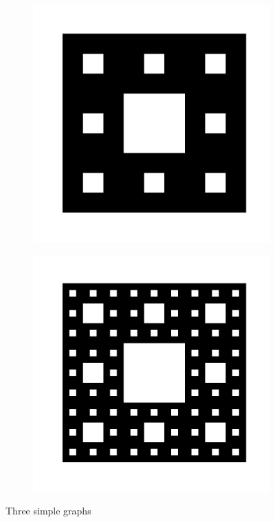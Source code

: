 \begin{figure}[h!]
\begin{subfigure}[b!]{0.27 \textwidth}
         \label{}
     \end{subfigure}\hspace*{-0.9em}
     \begin{subfigure}[b!]{0.27 \textwidth}
         \caption{}
         \includegraphics[width=\textwidth]{Imagenes/Fractal/sierpinski_carpet_3.pdf}
         \label{}
     \end{subfigure}\hspace*{-0.9em}
     \begin{subfigure}[b!]{0.27 \textwidth}
         \caption{}
         \includegraphics[width=\textwidth]{Imagenes/Fractal/sierpinski_carpet_4.pdf}
         \label{}
     \end{subfigure}
        \caption{Three simple graphs}
        \label{fig:three graphs}
\end{figure}

